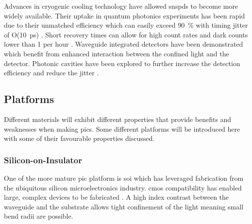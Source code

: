 
Advances in cryogenic cooling technology have allowed \acp{snspd} to become more widely available. Their uptake in quantum photonics experiments has been rapid due to their unmatched efficiency which can easily exceed \SI{90}{\percent} with timing jitter of O(\SI{10}{ps}) \cite{hadfield2009single}. Short recovery times can allow for high count rates and dark counts lower than 1 per hour \cite{wollman2017}. Waveguide integrated detectors have been demonstrated \cite{sprengers2011} which benefit from enhanced interaction between the confined light and the detector. Photonic cavities have been explored to further increase the detection efficiency and reduce the jitter \cite{vetter2016, yun2019, tyler2016modelling}.



\subsection{Platforms}

Different materials will exhibit different properties that provide benefits and weaknesses when making \acp{pic}. Some different platforms will be introduced here with some of their favourable properties discussed.

\subsubsection*{Silicon-on-Insulator}

One of the more mature \ac{pic} platform is \ac{soi} which has leveraged fabrication from the ubiquitous silicon microelectronics industry. \Ac{cmos} compatibility has enabled large, complex devices to be fabricated \cite{wang2019integrated}. A high index contrast between the waveguide and the substrate allows tight confinement of the light meaning small bend radii are possible. 

